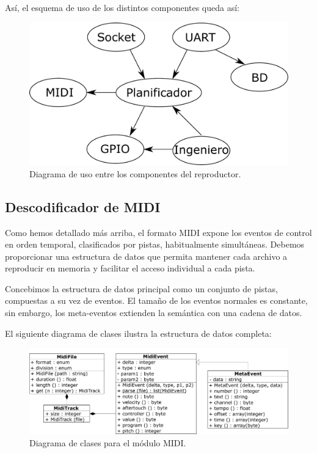Así, el esquema de uso de los distintos componentes queda así:

\smallskip

\begin{figure}[H]
	\noindent \begin{centering}
		\includegraphics[width=\linewidth/2]{capitulo4/daemon}
		\par\end{centering}
	\smallskip
	\caption{\label{fig:daemon} Diagrama de uso entre los componentes del reproductor.}
\end{figure} 

\smallskip

\subsection{Descodificador de MIDI}
\label{subsec:daemon_midi}

Como hemos detallado más arriba, el formato \acrshort{MIDI} expone los eventos de control en orden temporal, clasificados por pistas, habitualmente simultáneas. Debemos proporcionar una estructura de datos que permita mantener cada archivo a reproducir en memoria y facilitar el acceso individual a cada pista.

Concebimos la estructura de datos principal como un conjunto de pistas, compuestas a su vez de eventos. El tamaño de los eventos normales es constante, sin embargo, los meta-eventos extienden la semántica con una cadena de datos.

El siguiente diagrama de clases ilustra la estructura de datos completa:

\smallskip

\begin{figure}[H]
	\noindent \begin{centering}
		\includegraphics[width=\linewidth*3/4]{capitulo4/uml_midi}
		\par\end{centering}
	\smallskip
	\caption{\label{fig:uml_midi} Diagrama de clases para el módulo MIDI.}
\end{figure} 

